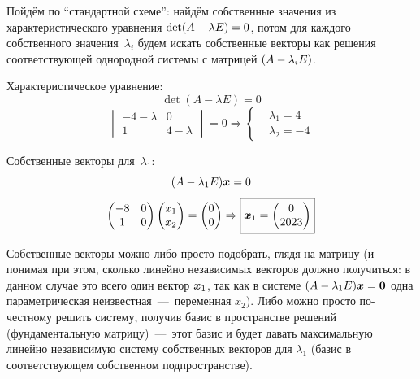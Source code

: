 \documentclass[a4paper,12pt]{article}
\begin{document}
  \begin{solution}
    Пойдём по ``стандартной схеме'': найдём собственные значения из характеристического уравнения $\det(A \hm- \lambda E) \hm= 0$, потом для каждого собственного значения~$\lambda_i$ будем искать собственные векторы как решения соответствующей однородной системы с матрицей $(A \hm- \lambda_i E)$.
    
    Характеристическое уравнение:
    \[
      \det(A - \lambda E) = 0
    \]
    \[
      \begin{vmatrix}
        -4 - \lambda & 0\\
        1 & 4 - \lambda
      \end{vmatrix} = 0 \Rightarrow \left\{
        \begin{aligned}
          &\lambda_1 = 4\\
          &\lambda_2 = -4
        \end{aligned}
      \right.
    \]
    
    Собственные векторы для~$\lambda_1$:
    \[
      (A - \lambda_1 E) \boldsymbol x = 0
    \]
    \[
      \begin{pmatrix}
        -8 & 0\\
        1 & 0
      \end{pmatrix} \begin{pmatrix}
        x_1\\
        x_2
      \end{pmatrix} = \begin{pmatrix}
        0\\
        0
      \end{pmatrix}
      \Rightarrow \boxed{
        \boldsymbol x_1 = \begin{pmatrix}
          0\\
          2023
        \end{pmatrix}
      }
    \]
    
    Собственные векторы можно либо просто подобрать, глядя на матрицу (и понимая при этом, сколько линейно независимых векторов должно получиться: в данном случае это всего один вектор $\boldsymbol x_1$, так как в системе $(A \hm- \lambda_1 E) \bds x \hm= \bds 0$ одна параметрическая неизвестная~---~переменная $x_2$).
    Либо можно просто по-честному решить систему, получив базис в пространстве решений (фундаментальную матрицу)~---~этот базис и будет давать максимальную линейно независимую систему собственных векторов для $\lambda_1$ (базис в соответствующем собственном подпространстве).
    

\end{solution}
\end{document}
